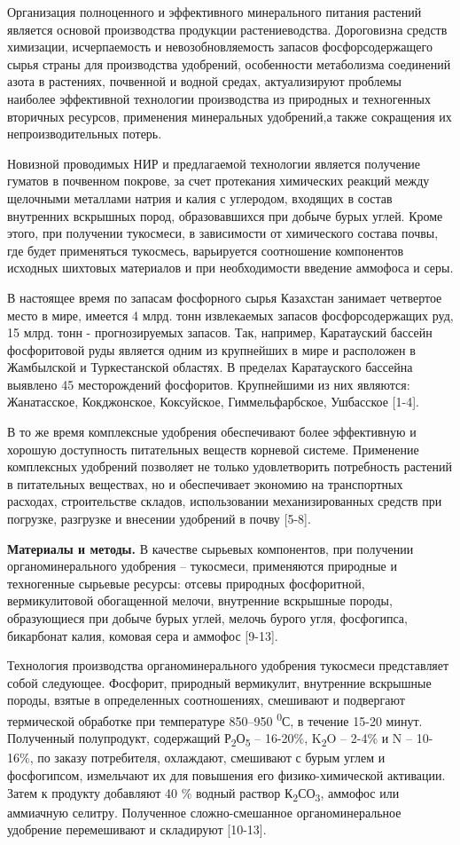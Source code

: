 Организация полноценного и эффективного минерального питания растений
является основой производства продукции растениеводства. Дороговизна
средств химизации, исчерпаемость и невозобновляемость запасов
фосфорсодержащего сырья страны для производства удобрений, особенности
метаболизма соединений азота в растениях, почвенной и водной средах,
актуализируют проблемы наиболее эффективной технологии производства из
природных и техногенных вторичных ресурсов, применения минеральных
удобрений,а также сокращения их непроизводительных потерь.

Новизной проводимых НИР и предлагаемой технологии является получение
гуматов в почвенном покрове, за счет протекания химических реакций между
щелочными металлами натрия и калия с углеродом, входящих в состав
внутренних вскрышных пород, образовавшихся при добыче бурых углей. Кроме
этого, при получении тукосмеси, в зависимости от химического состава
почвы, где будет применяться тукосмесь, варьируется соотношение
компонентов исходных шихтовых материалов и при необходимости введение
аммофоса и серы.

В настоящее время по запасам фосфорного сырья Казахстан занимает
четвертое место в мире, имеется 4 млрд. тонн извлекаемых запасов
фосфорсодержащих руд, 15 млрд. тонн - прогнозируемых запасов. Так,
например, Каратауский бассейн фосфоритовой руды является одним из
крупнейших в мире и расположен в Жамбылской и Туркестанской областях. В
пределах Каратауского бассейна выявлено 45 месторождений фосфоритов.
Крупнейшими из них являются: Жанатасское, Кокджонское, Коксуйское,
Гиммельфарбское, Ушбасское {[}1-4{]}.

В то же время комплексные удобрения обеспечивают более эффективную и
хорошую доступность питательных веществ корневой системе. Применение
комплексных удобрений позволяет не только удовлетворить потребность
растений в питательных веществах, но и обеспечивает экономию на
транспортных расходах, строительстве складов, использовании
механизированных средств при погрузке, разгрузке и внесении удобрений в
почву {[}5-8{]}.

\textbf{Материалы и методы.} В качестве сырьевых компонентов, при
получении органоминерального удобрения -- тукосмеси, применяются
природные и техногенные сырьевые ресурсы: отсевы природных фосфоритной,
вермикулитовой обогащенной мелочи, внутренние вскрышные породы,
образующиеся при добыче бурых углей, мелочь бурого угля, фосфогипса,
бикарбонат калия, комовая сера и аммофос {[}9-13{]}.

Технология производства органоминерального удобрения тукосмеси
представляет собой следующее. Фосфорит, природный вермикулит, внутренние
вскрышные породы, взятые в определенных соотношениях, смешивают и
подвергают термической обработке при температуре 850--950
\textsuperscript{0}С, в течение 15-20 минут. Полученный полупродукт,
содержащий Р\textsubscript{2}О\textsubscript{5} -- 16-20\%,
K\textsubscript{2}O -- 2-4\% и N -- 10-16\%, по заказу потребителя,
охлаждают, смешивают с бурым углем и фосфогипсом, измельчают их для
повышения его физико-химической активации. Затем к продукту добавляют 40
\% водный раствор К\textsubscript{2}СО\textsubscript{3}, аммофос или
аммиачную селитру. Полученное сложно-смешанное органоминеральное
удобрение перемешивают и складируют {[}10-13{]}.

